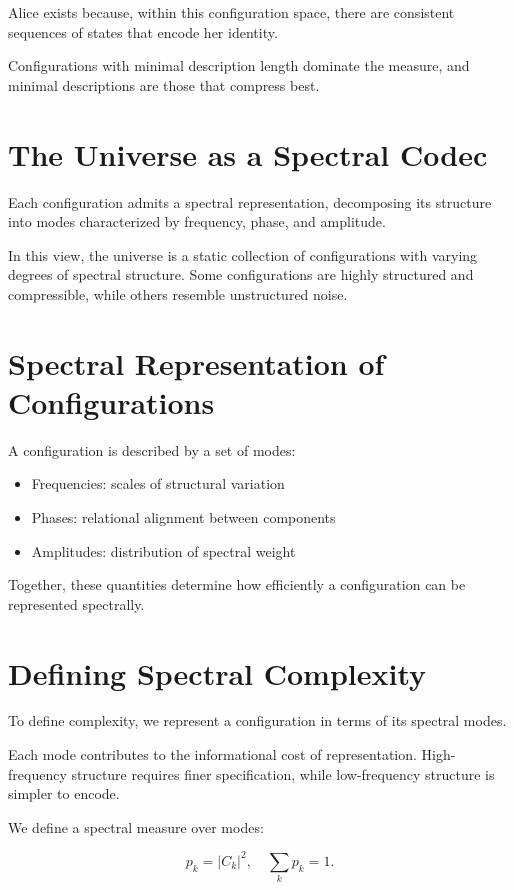 Alice exists because, within this configuration space, there are consistent sequences of states that encode her identity.

Configurations with minimal description length dominate the measure, and minimal descriptions are those that compress best.


\section{The Universe as a Spectral Codec}

Each configuration admits a spectral representation, decomposing its structure into modes characterized by frequency, phase, and amplitude.

In this view, the universe is a static collection of configurations with varying degrees of spectral structure.
Some configurations are highly structured and compressible, while others resemble unstructured noise.


\section{Spectral Representation of Configurations}

A configuration is described by a set of modes:

\begin{itemize}
    \item Frequencies: scales of structural variation
    \item Phases: relational alignment between components
    \item Amplitudes: distribution of spectral weight
\end{itemize}

Together, these quantities determine how efficiently a configuration can be represented spectrally.


\section{Defining Spectral Complexity}

To define complexity, we represent a configuration in terms of its spectral modes.

Each mode contributes to the informational cost of representation.
High-frequency structure requires finer specification, while low-frequency structure is simpler to encode.

We define a spectral measure over modes:

\[
p_k = |C_k|^2, \quad \sum_k p_k = 1.
\]

